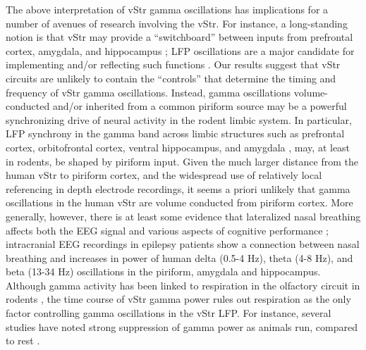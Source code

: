 \documentclass[11pt]{article}
\let\cite=\citep
\begin{document}
The above interpretation of vStr gamma oscillations has implications
for a number of avenues of research involving the vStr. For instance,
a long-standing notion is that vStr may provide a ``switchboard''
between inputs from prefrontal cortex, amygdala, and hippocampus
\cite{Odonnell1995,Gruber2009}; LFP oscillations are a major candidate
for implementing and/or reflecting such functions \cite{Fries2005a,
  Fries2015}. Our results suggest that vStr circuits are unlikely to
contain the ``controls'' that determine the timing and frequency of
vStr gamma oscillations. Instead, gamma oscillations volume-conducted
and/or inherited from a common piriform source may be a powerful
synchronizing drive of neural activity in the rodent limbic system. In
particular, LFP synchrony in the gamma band across limbic structures
such as prefrontal cortex, orbitofrontal cortex, ventral hippocampus,
and amygdala \cite{VanWingerden2014,Harris2015,Catanese2016}, may, at
least in rodents, be shaped by piriform input. Given the much larger
distance from the human vStr to piriform cortex, and the widespread
use of relatively local referencing in depth electrode recordings, it
seems a priori unlikely that gamma oscillations in the human vStr are
volume conducted from piriform cortex.  More generally, however, there
is at least some evidence that lateralized nasal breathing affects
both the EEG signal and various aspects of cognitive performance
\cite{Block1989,Zelano2016}; intracranial EEG recordings in epilepsy
patients show a connection between nasal breathing and increases in
power of human delta (0.5-4 Hz), theta (4-8 Hz), and beta (13-34 Hz)
oscillations in the piriform, amygdala and hippocampus. Although gamma
activity has been linked to respiration in the olfactory circuit in
rodents \cite{Gault1963}, the time course of vStr gamma power rules
out respiration as the only factor controlling gamma oscillations in
the vStr LFP. For instance, several studies have noted strong
suppression of gamma power as animals run, compared to rest
\cite{Vandermeer2009a,Malhotra2015a}.
\end{document}
